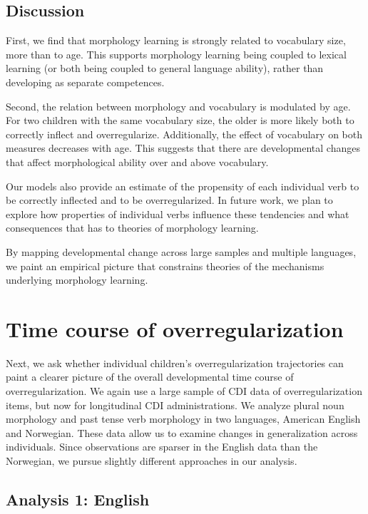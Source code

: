 \documentclass[
   11pt,
       ]{book}
\begin{document}
\hypertarget{discussion-1}{%
\subsection{Discussion}\label{discussion-1}}

First, we find that morphology learning is strongly related to vocabulary size, more than to age. This supports morphology learning being coupled to lexical learning (or both being coupled to general language ability), rather than developing as separate competences.

Second, the relation between morphology and vocabulary is modulated by age. For two children with the same vocabulary size, the older is more likely both to correctly inflect and overregularize. Additionally, the effect of vocabulary on both measures decreases with age. This suggests that there are developmental changes that affect morphological ability over and above vocabulary.

Our models also provide an estimate of the propensity of each individual verb to be correctly inflected and to be overregularized. In future work, we plan to explore how properties of individual verbs influence these tendencies and what consequences that has to theories of morphology learning.

By mapping developmental change across large samples and multiple languages, we paint an empirical picture that constrains theories of the mechanisms underlying morphology learning.

\hypertarget{time-course-of-overregularization}{%
\section{Time course of overregularization}\label{time-course-of-overregularization}}

Next, we ask whether individual children's overregularization trajectories can paint a clearer picture of the overall developmental time course of overregularization. We again use a large sample of CDI data of overregularization items, but now for longitudinal CDI administrations. We analyze plural noun morphology and past tense verb morphology in two languages, American English and Norwegian. These data allow us to examine changes in generalization across individuals. Since observations are sparser in the English data than the Norwegian, we pursue slightly different approaches in our analysis.

\hypertarget{analysis-1-english}{%
\subsection{Analysis 1: English}\label{analysis-1-english}}
\end{document}
